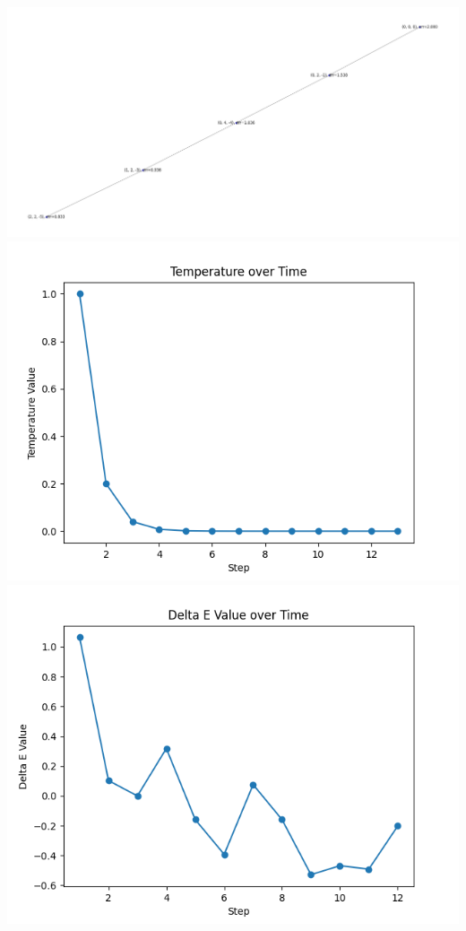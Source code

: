 \documentclass{article}
\begin{document}
\includegraphics[width=6in]{_static/Figure_4_Temp=5_Path=5.png}
\includegraphics[width=6in]{_static/Figure_7_Temp=5_Temp-over-Time.png}
\includegraphics[width=6in]{_static/Figure_12_Temp=5_Delta-E-over-Time.png}
\end{document}
